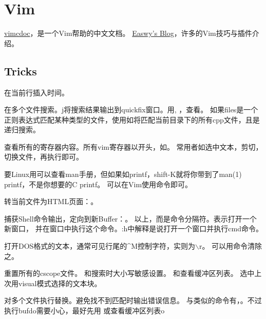\chapter{Vim}
\noindent\href{http://vimcdoc.sourceforge.net/}{vimcdoc}，是一个Vim帮助的中文文档。
\noindent\href{http://easwy.com/blog/}{Easwy's Blog}，许多的Vim技巧与插件介绍。

\section{Tricks}
 在当前行插入时间。

在多个文件搜索。j将搜索结果输出到quickfix窗口。用, ，查看。
如果files是一个正则表达式匹配某种类型的文件，使用如将匹配当前目录下的所有cpp文件，且是递归搜索。

查看所有的寄存器内容。所有vim寄存器以开头，如。
常用者如选中文本，剪切，切换文件，再执行即可。

要Linux用可以查看man手册，但如果如printf，shift-K就将你带到了man(1) printf，不是你想要的C printf。
可以在Vim使用命令即可。

转当前文件为HTML页面：。

捕获Shell命令输出，定向到新Buffer：。
以上，而是命令分隔符。表示打开一个新窗口，
并在窗口中执行这个命令。:h中解释是说打开一个窗口并执行cmd命令。

打开DOS格式的文本，通常可见行尾的\^{}M控制字符，实则为$\backslash$r。
可以用命令清除之。

重置所有的cscope文件。
和搜索时大小写敏感设置。
和查看缓冲区列表。
选中上次用visual模式选择的文本块。

对多个文件执行替换。避免找不到匹配时输出错误信息。
与类似的命令有，。不过执行bufdo需要小心，最好先用
或查看缓冲区列表o


